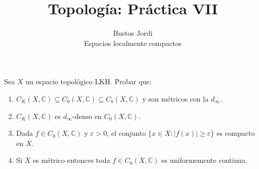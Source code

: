 \documentclass{article}
\theoremstyle{plain}
\theoremstyle{definition}
\newenvironment{ejercicio}[1]{\begin{trivlist}
\item[\hskip \labelsep {\bfseries Ejercicio}\hskip \labelsep {\bfseries #1.}]}{\end{trivlist}}
\begin{document}
\title{Topología: Práctica VII}
\author{Bustos Jordi\\Espacios localmente compactos}

\maketitle

\begin{ejercicio}{1}
    Sea \( X \) un espacio topológico LKH. Probar que:
    \begin{enumerate}
        \item[(a)] \( C_{K}(X,\mathbb{C}) \subseteq C_{0}(X, \mathbb{C}) \subseteq C_{b}(X, \mathbb{C}) \) y son métricos con la \( d_{\infty} \).
        \item[(b)] \( C_{K}(X,\mathbb{C}) \) es \( d_{\infty} \)-denso en \( C_{0}(X,\mathbb{C}) \).
        \item[(c)] Dada \( f \in C_{0}(X,\mathbb{C}) \) y \( \varepsilon > 0 \), el conjunto \( \{x \in X : |f(x)| \ge \varepsilon \} \) es compacto en \( X \).
        \item[(d)] Si \( X \) es métrico entonces toda \( f \in C_{0}(X,\mathbb{C}) \) es uniformemente continua.
    \end{enumerate}
\end{ejercicio}
\end{document}
